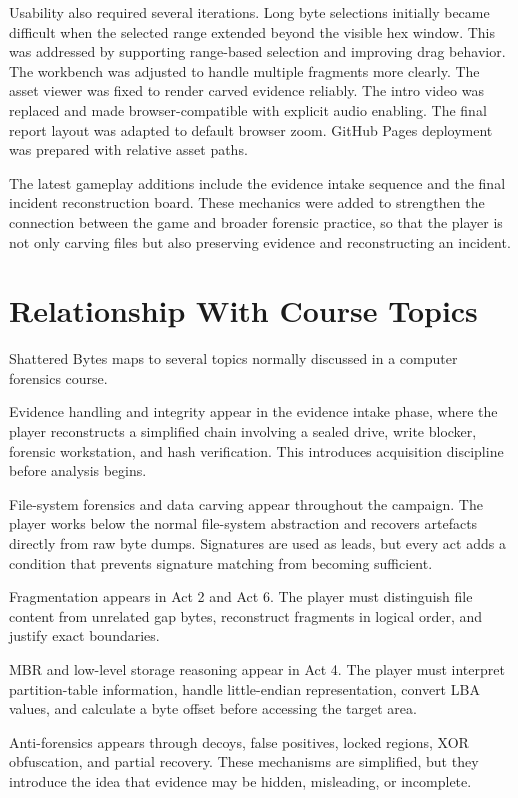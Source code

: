 \documentclass[11pt,a4paper]{article}
\newcommand{\projecttitle}{Shattered Bytes}
\begin{document}
Usability also required several iterations. Long byte selections initially became difficult when the selected range extended beyond the visible hex window. This was addressed by supporting range-based selection and improving drag behavior. The workbench was adjusted to handle multiple fragments more clearly. The asset viewer was fixed to render carved evidence reliably. The intro video was replaced and made browser-compatible with explicit audio enabling. The final report layout was adapted to default browser zoom. GitHub Pages deployment was prepared with relative asset paths.

The latest gameplay additions include the evidence intake sequence and the final incident reconstruction board. These mechanics were added to strengthen the connection between the game and broader forensic practice, so that the player is not only carving files but also preserving evidence and reconstructing an incident.

\section{Relationship With Course Topics}

\projecttitle{} maps to several topics normally discussed in a computer forensics course.

Evidence handling and integrity appear in the evidence intake phase, where the player reconstructs a simplified chain involving a sealed drive, write blocker, forensic workstation, and hash verification. This introduces acquisition discipline before analysis begins.

File-system forensics and data carving appear throughout the campaign. The player works below the normal file-system abstraction and recovers artefacts directly from raw byte dumps. Signatures are used as leads, but every act adds a condition that prevents signature matching from becoming sufficient.

Fragmentation appears in Act 2 and Act 6. The player must distinguish file content from unrelated gap bytes, reconstruct fragments in logical order, and justify exact boundaries.

MBR and low-level storage reasoning appear in Act 4. The player must interpret partition-table information, handle little-endian representation, convert LBA values, and calculate a byte offset before accessing the target area.

Anti-forensics appears through decoys, false positives, locked regions, XOR obfuscation, and partial recovery. These mechanisms are simplified, but they introduce the idea that evidence may be hidden, misleading, or incomplete.
\end{document}
